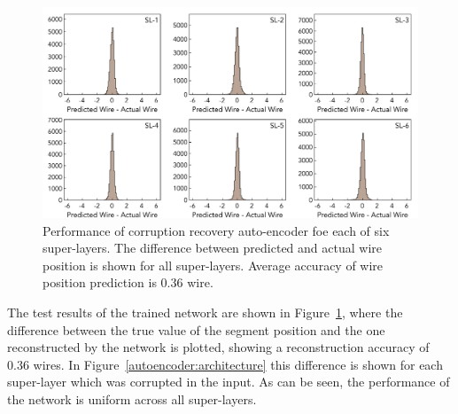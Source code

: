  \begin{figure}[!ht]
\begin{center}
\includegraphics[width=6.0in]{images/encoder_performance.pdf}
\caption {Performance of corruption recovery auto-encoder foe each of six super-layers. The difference between predicted and actual 
wire position is shown for all super-layers. Average accuracy of wire position prediction is  $0.36$ wire.}
 \label{autoencoder:performance}
 \end{center}
\end{figure}

The test results of the trained network are shown in Figure~\ref{autoencoder:performance}, where the 
difference between the true value of the segment position and the one reconstructed by the network is 
plotted, showing a reconstruction accuracy of $0.36$ wires. In Figure~\ref{autoencoder:architecture} 
this difference is shown for each super-layer which was corrupted in the input. As can be seen, 
the performance of the network is uniform across all super-layers.
